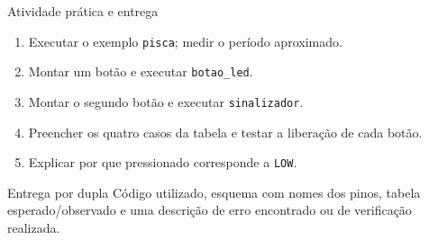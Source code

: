 \begin{frame}[t]{Atividade prática e entrega}
\begin{enumerate}
\item Executar o exemplo \texttt{pisca}; medir o período aproximado.
\item Montar um botão e executar \texttt{botao\_led}.
\item Montar o segundo botão e executar \texttt{sinalizador}.
\item Preencher os quatro casos da tabela e testar a liberação de cada botão.
\item Explicar por que pressionado corresponde a \texttt{LOW}.
\end{enumerate}
\begin{block}{Entrega por dupla}
Código utilizado, esquema com nomes dos pinos, tabela esperado/observado e uma descrição de erro encontrado ou de verificação realizada.
\end{block}
\end{frame}
